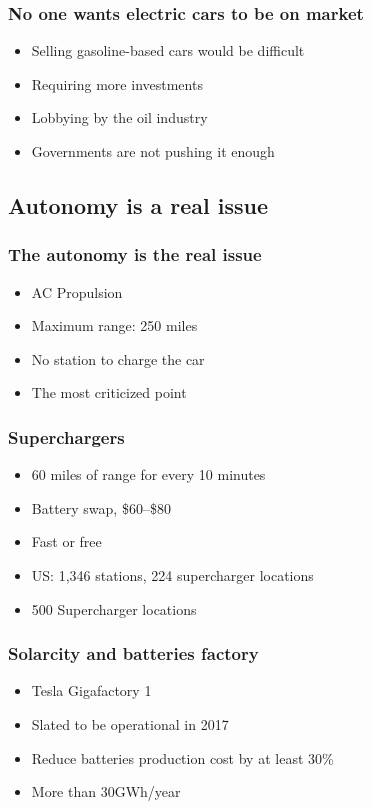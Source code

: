 \begin{frame}
\frametitle{No one wants electric cars to be on market}
\begin{itemize}
    \itemsep1.5em
    \item Selling gasoline-based cars would be difficult %
    \item Requiring more investments
    \item Lobbying by the oil industry  %
    \item Governments are not pushing it enough %
\end{itemize}
\end{frame}


\subsection{Autonomy is a real issue}

\begin{frame}
\frametitle{The autonomy is the real issue}
\begin{itemize}
    \itemsep1.5em
    \item AC Propulsion
    \item Maximum range: 250 miles
    \item No station to charge the car
    \item The most criticized point
\end{itemize}
\end{frame}

\begin{frame}
\frametitle{Superchargers}
\begin{itemize}
    \itemsep1.5em
    \item 60 miles of range for every 10 minutes
    \item Battery swap, \$60--\$80
    \item Fast or free
    \item US\@: 1,346 stations, 224 supercharger locations
    \item 500 Supercharger locations
\end{itemize}
\end{frame}


\begin{frame}
\frametitle{Solarcity and batteries factory}
\begin{itemize}
    \itemsep1.5em
    \item Tesla Gigafactory 1 %
    \item Slated to be operational in 2017
    \item Reduce batteries production cost by at least 30\%
    \item More than 30GWh/year
\end{itemize}
\end{frame}


